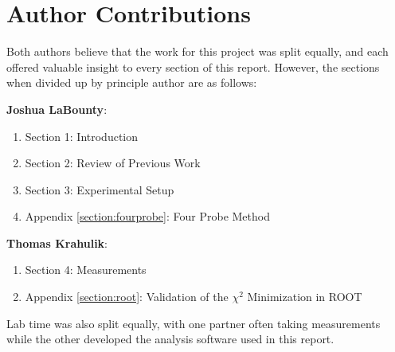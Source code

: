 \documentclass[%
 reprint,
 amsmath,amssymb,
 aps,
 pra,
]{revtex4-1}
\begin{document}
\section{Author Contributions}

Both authors believe that the work for this project was split equally, and each offered valuable insight to every section of this report. However, the sections when divided up by principle author are as follows:

\noindent \textbf{Joshua LaBounty}:
\begin{enumerate}
	\item Section 1: Introduction
	\item Section 2: Review of Previous Work
	\item Section 3: Experimental Setup
	\item Appendix \ref{section:fourprobe}: Four Probe Method
\end{enumerate}

\noindent \textbf{Thomas Krahulik}:
\begin{enumerate}
	\item Section 4: Measurements
	\item Appendix \ref{section:root}: Validation of the $\chi^2$ Minimization in ROOT
\end{enumerate}

\noindent Lab time was also split equally, with one partner often taking measurements while the other developed the analysis software used in this report.
\end{document}
